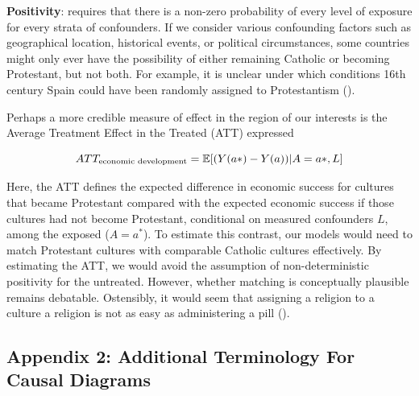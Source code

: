 \documentclass[
  singlecolumn,
  9pt]{article}
\begin{document}
\textbf{Positivity}: requires that there is a non-zero probability of
every level of exposure for every strata of confounders. If we consider
various confounding factors such as geographical location, historical
events, or political circumstances, some countries might only ever have
the possibility of either remaining Catholic or becoming Protestant, but
not both. For example, it is unclear under which conditions 16th century
Spain could have been randomly assigned to Protestantism
().

Perhaps a more credible measure of effect in the region of our interests
is the Average Treatment Effect in the Treated (ATT) expressed

\[ATT_{\textnormal{economic~development}} = \mathbb{E}[(Y(a*)- Y(a))|A = a*,L]\]

Here, the ATT defines the expected difference in economic success for
cultures that became Protestant compared with the expected economic
success if those cultures had not become Protestant, conditional on
measured confounders \(L\), among the exposed (\(A = a^*\)). To estimate
this contrast, our models would need to match Protestant cultures with
comparable Catholic cultures effectively. By estimating the ATT, we
would avoid the assumption of non-deterministic positivity for the
untreated. However, whether matching is conceptually plausible remains
debatable. Ostensibly, it would seem that assigning a religion to a
culture a religion is not as easy as administering a pill
().

\subsection{Appendix 2: Additional Terminology For Causal
Diagrams}\label{appendix-2-additional-terminology-for-causal-diagrams}
\end{document}
